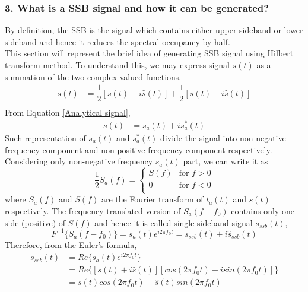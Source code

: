 \subsubsection{3. What is a SSB signal and how it can be generated?}
By definition, the SSB is the signal which contains either upper sideband or lower sideband and hence it reduces the spectral occupancy by half. \\
This section will represent the brief idea of generating SSB signal using Hilbert transform method. To understand this, we may express signal $s(t)$ as a summation of the two complex-valued functions.
\begin{equation}
\begin{split}
s(t)&=\dfrac{1}{2}[s(t)+i\hat{s}(t)]+\dfrac{1}{2}[s(t)-i\hat{s}(t)]\\
\end{split}
\label{}
\end{equation}
From Equation \ref{Analytical signal},
\begin{equation}
\begin{split}
	s(t)&=s_a(t)+i{s_a^*}(t)
\end{split}
\label{}
\end{equation}
Such representation of ${s_a}(t)$ and ${s_a^*}(t)$ divide the signal into non-negative frequency component and non-positive frequency component respectively. Considering only non-negative frequency ${s_a}(t)$ part, we can write it as
\begin{equation}
\dfrac{1}{2}{S_a}(f) = \begin{cases}
S(f) &\text{for $f>0$}\\
0    &\text{for $f<0$}\\
\end{cases}
\end{equation}
where ${S_a}(f)$ and ${S}(f)$ are the Fourier transform of ${t_a}(t)$ and ${s}(t)$ respectively. The frequency translated version of ${S_a}(f-f_0)$ contains only one side (positive) of ${S}(f)$ and hence it is called single sideband signal ${s_{ssb}}(t)$,
\begin{equation}
{F}^{-1}\{S_a(f-f_0)\}={s_a}(t) e^{i2\pi f_0 t}={s_{ssb}}(t)+i{\hat{s}_{ssb}(t)}
\end{equation}
Therefore, from the Euler's formula,
\begin{equation}
\begin{split}
{s}_{ssb}(t)&=Re\{s_a(t)  e^{i2\pi f_0 t}\}\\
&=Re\{[s(t)+i\hat{s}(t)] [cos(2\pi f_0t)+isin(2\pi f_0t)]\}\\
&=s(t)cos(2\pi f_0t)-\hat{s}(t)sin(2\pi f_0t)
\end{split}
\label{USB_SSB}
\end{equation}
